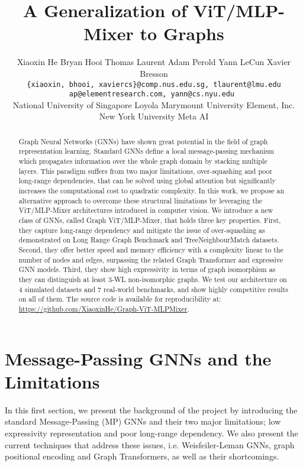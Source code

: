 \documentclass{article}
\title{A Generalization of ViT/MLP-Mixer to Graphs}
\author{Xiaoxin He 
  \hspace{0.18cm}
  Bryan Hooi
  \hspace{0.18cm}
  Thomas Laurent 
  \hspace{0.18cm}
  Adam Perold 
  \hspace{0.18cm}
  Yann LeCun 
  \hspace{0.18cm}
  Xavier Bresson \vspace{0.15cm} \\
  \texttt{\{xiaoxin, bhooi, xaviercs\}@comp.nus.edu.sg, tlaurent@lmu.edu} \\ \texttt{ap@elementresearch.com, yann@cs.nyu.edu } \vspace{0.15cm} \\
  {\normalfont National University of Singapore \hspace{0.18cm} Loyola Marymount University \hspace{0.18cm} Element, Inc.}\\
  New York University \hspace{0.18cm} Meta AI \hspace{0.14cm}
}
\begin{document}
\maketitle

\begin{abstract}
Graph Neural Networks (GNNs) have shown great potential in the field of graph representation learning. Standard GNNs define a local message-passing mechanism which propagates information over the whole graph domain by stacking multiple layers. This paradigm suffers from two major limitations, over-squashing and poor long-range dependencies, that can be solved using global attention but significantly increases the computational cost to quadratic complexity. 
In this work, we propose an alternative approach to overcome these structural limitations by leveraging the ViT/MLP-Mixer architectures introduced in computer vision.
We introduce a new class of GNNs, called Graph ViT/MLP-Mixer, that holds three key properties. First, they capture long-range dependency and mitigate the issue of over-squashing as demonstrated on Long Range Graph Benchmark and TreeNeighbourMatch datasets. Second, they offer better speed and memory efficiency with a complexity linear to the number of nodes and edges, surpassing the related Graph Transformer and expressive GNN models. Third, they show high expressivity in terms of graph isomorphism as they can distinguish at least 3-WL non-isomorphic graphs. 
We test our architecture on 4 simulated datasets and 7 real-world benchmarks, and show highly competitive results on all of them. 
The source code is available for reproducibility at: \url{https://github.com/XiaoxinHe/Graph-ViT-MLPMixer}.
\end{abstract}


\section{Message-Passing GNNs and the Limitations}\label{sec: intro}


In this first section, we present the background of the project by introducing the standard Message-Passing (MP) GNNs and their two major limitations; low expressivity representation and poor long-range dependency. We also present the current techniques that address these issues, i.e. Weisfeiler-Leman GNNs, graph positional encoding and Graph Transformers, as well as their shortcomings.
\end{document}
